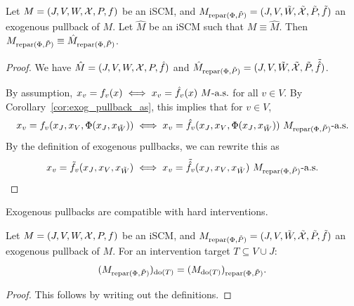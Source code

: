 \begin{Lem}\label{lem:exog_pullback_equiv}
  Let $M = \left ( J, V, W, \mathcal{X}, P, f \right )$ be an iSCM, and $M_{\mathrm{repar}({\Phi},{\tilde{P}})} = ( J, V, \tilde{W}, \tilde{\mathcal{X}}, \tilde{P}, \tilde{f} )$ an exogenous pullback of $M$.
  Let $\hat{M}$ be an iSCM such that $M \equiv \hat{M}$.
  Then $M_{\mathrm{repar}({\Phi},{\tilde{P}})} \equiv \hat{M}_{\mathrm{repar}({\Phi},{\tilde{P}})}$.
\end{Lem}
\begin{proof}
  We have $\hat{M} = ( J, V, W, \mathcal{X}, P, \hat{f} )$ and $\hat{M}_{\mathrm{repar}({\Phi},{\tilde{P}})} = ( J, V, \tilde{W}, \tilde{\mathcal{X}}, \tilde{P}, \tilde{\hat{f}} )$.

  By assumption, $x_v = f_v(x) \iff x_v = \hat{f}_v(x)\ M\text{-a.s.}$ for all $v \in V$.
  By Corollary~\ref{cor:exog_pullback_as}, this implies that for $v \in V$,
  $$x_v = f_v(x_J,x_V,\Phi(x_J,x_{\tilde{W}})) \iff x_v = \hat{f}_v(x_J,x_V,\Phi(x_J,x_{\tilde{W}}))\ M_{\repar{\Phi}{\tilde{P}}}\as$$
  By the definition of exogenous pullbacks, we can rewrite this as
  \[x_v = \tilde f_v(x_J,x_V,x_{\tilde{W}}) \iff x_v = \tilde{\hat{f}}_v(x_J,x_V,x_{\tilde{W}})\ M_{\repar{\Phi}{\tilde{P}}}\as\qedhere\]
\end{proof}

Exogenous pullbacks are compatible with hard interventions.
\begin{Lem}\label{lem:interventions_exogenous_pullback_commute}
Let $M = \left ( J, V, W, \mathcal{X}, P, f \right )$ be an iSCM, and $M_{\mathrm{repar}({\Phi},{\tilde{P}})} = ( J, V, \tilde{W}, \tilde{\mathcal{X}}, \tilde{P}, \tilde{f} )$ an exogenous pullback of $M$.
For an intervention target $T \subseteq V \cup J$:
  $$(M_{\mathrm{repar}({\Phi},{\tilde{P}})})_{\operatorname{do}(T)} = (M_{\operatorname{do}(T)})_{\mathrm{repar}({\Phi},{\tilde{P}})}.$$
\end{Lem}
\begin{proof}
  This follows by writing out the definitions.
\end{proof}


